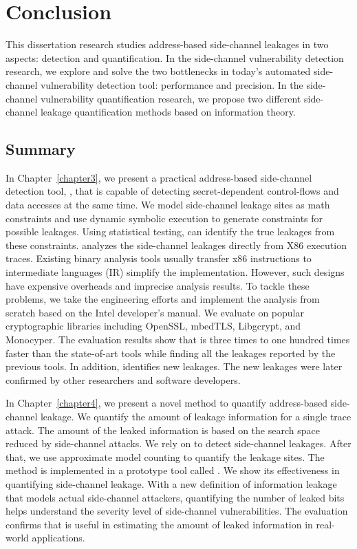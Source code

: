 \chapter{Conclusion}\label{chapter7}
This dissertation research studies address-based side-channel leakages in two aspects: detection and quantification. In the side-channel vulnerability detection research, we explore and solve the two bottlenecks in today's automated side-channel vulnerability detection tool: performance and precision. In the side-channel vulnerability quantification research, we propose two different side-channel leakage quantification methods based on information theory. 

\section{Summary}

In Chapter~\ref{chapter3}, we present a practical address-based side-channel detection tool, \detect{}, that is capable of detecting secret-dependent control-flows and data accesses at the same time. We model side-channel leakage sites as math constraints and use dynamic symbolic execution to generate constraints for possible leakages. Using statistical testing, \detect{} can identify the true leakages from these constraints. \detect{} analyzes the side-channel leakages directly from X86 execution traces. Existing binary analysis tools usually transfer x86 instructions to intermediate languages (IR) simplify the implementation. However, such designs have expensive overheads and imprecise analysis results. To tackle these problems, we take the engineering efforts and implement the analysis from scratch  based on the Intel developer's manual. We evaluate \detect{} on popular cryptographic libraries including OpenSSL, mbedTLS, Libgcrypt, and Monocyper. The evaluation results show that \detect{} is three times to one hundred times faster than the state-of-art tools while finding all the leakages reported by the previous tools. In addition, \detect{} identifies new leakages. The new leakages were later confirmed by other researchers and software developers.  

In Chapter~\ref{chapter4}, we present a novel method to quantify address-based side-channel leakage. We quantify the amount of leakage information for a single trace attack. The amount of the leaked information is based on the search space reduced by side-channel attacks. We rely on \detect{} to detect side-channel leakages. After that, we use approximate model counting to quantify the leakage sites. The method is implemented in a prototype tool called \tool{}. We show its effectiveness in quantifying side-channel leakage. With a new definition of information leakage that models actual side-channel attackers, quantifying the number of leaked bits helps understand the severity level of side-channel vulnerabilities. The evaluation confirms that \tool{} is useful in estimating the amount of leaked information in real-world applications.

